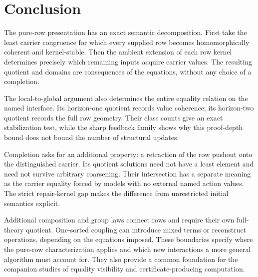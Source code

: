 \section{Conclusion}

The pure-row presentation has an exact semantic decomposition. First take
the least carrier congruence for which every supplied row becomes
homomorphically coherent and kernel-stable. Then the ambient extension of
each row kernel determines precisely which remaining inputs acquire
carrier values. The resulting quotient and domains are consequences of
the equations, without any choice of a completion.

The local-to-global argument also determines the entire equality relation
on the named interface. Its horizon-one quotient records value coherence;
its horizon-two quotient records the full row geometry. Their class counts
give an exact stabilization test, while the sharp feedback family shows
why this proof-depth bound does not bound the number of structural updates.

Completion asks for an additional property: a retraction of the row
pushout onto the distinguished carrier. Its quotient solutions need not
have a least element and need not survive arbitrary coarsening. Their
intersection has a separate meaning as the carrier equality forced by
models with no external named action values. The strict repair-kernel gap
makes the difference from unrestricted initial semantics explicit.

Additional composition and group laws connect rows and require their own
full-theory quotient. One-sorted coupling can introduce mixed terms or
reconstruct operations, depending on the equations imposed. These
boundaries specify where the pure-row characterization applies and which
new interactions a more general algorithm must account for. They also
provide a common foundation for the companion studies of equality
visibility and certificate-producing computation.
